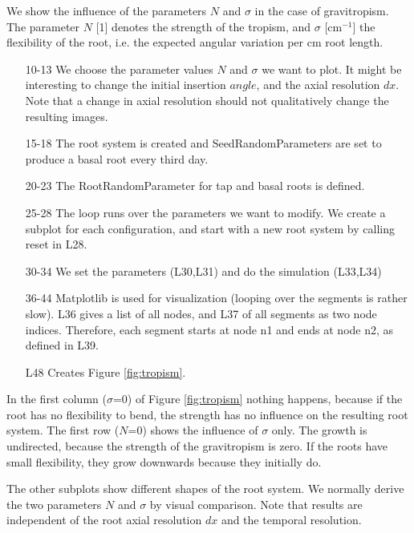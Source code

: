 We show the influence of the parameters $N$ and $\sigma$ in the case of gravitropism. The parameter $N$ [1] denotes the strength of the tropism, and $\sigma$ [cm$^{-1}$] the flexibility of the root, i.e. the expected angular variation per cm root length. 



\begin{itemize}
\item[10-13] We choose the parameter values $N$ and $\sigma$ we want to plot. It might be interesting to change the initial insertion $angle$, and the axial resolution $dx$. Note that a change in axial resolution should not qualitatively change the resulting images.

\item[15-18] The root system is created and SeedRandomParameters are set to produce a basal root every third day. 

\item[20-23] The RootRandomParameter for tap and basal roots is defined.

\item[25-28] The loop runs over the parameters we want to modify. We create a subplot for each configuration, and start with a new root system by calling reset in L28.

\item[30-34] We set the parameters (L30,L31) and do the simulation (L33,L34)

\item[36-44] Matplotlib is used for visualization (looping over the segments is rather slow). L36 gives a list of all nodes, and L37 of all segments as two node indices. Therefore, each segment starts at node n1 and ends at node n2, as defined in L39.

\item[L48] Creates Figure \ref{fig:tropism}.
\end{itemize}

In the first column ($\sigma$=0) of Figure \ref{fig:tropism} nothing happens, because if the root has no flexibility to bend, the strength has no influence on the resulting root system. The first row ($N$=0) shows the influence of $\sigma$ only. The growth is undirected, because the strength of the gravitropism is zero. If the roots have small flexibility, they grow downwards because they initially do. 

The other subplots show different shapes of the root system. We normally derive the two parameters $N$ and $\sigma$ by visual comparison. Note that results are independent of the root axial resolution $dx$ and the temporal resolution.

